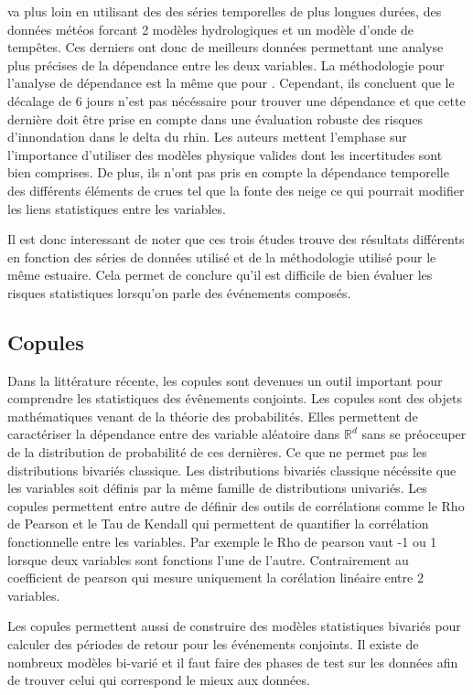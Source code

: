 \documentclass[12pt]{article}   %
\begin{document}
    \par
    \cite{Khanal2019} va plus loin en utilisant des des séries temporelles de plus longues durées, des données météos forcant 2 modèles hydrologiques et un modèle d'onde de tempêtes. Ces derniers ont donc de meilleurs données permettant une analyse plus précises de la dépendance entre les deux variables. La méthodologie pour l'analyse de dépendance est la même que pour \cite{Klerk2015}. Cependant, ils concluent que le décalage de 6 jours n'est pas nécéssaire pour trouver une dépendance et que cette dernière doit être prise en compte dans une évaluation robuste des risques d'innondation dans le delta du rhin. Les auteurs mettent l'emphase sur l'importance d'utiliser des modèles physique valides dont les incertitudes sont bien comprises. De plus, ils n'ont pas pris en compte la dépendance temporelle des différents éléments de crues tel que la fonte des neige ce qui pourrait modifier les liens statistiques entre les variables.  
\par
    Il est donc interessant de noter que ces trois études trouve des résultats différents en fonction des séries de données utilisé et de la méthodologie utilisé pour le même estuaire. Cela permet de conclure qu'il est difficile de bien évaluer les risques statistiques lorsqu'on parle des événements composés. 
\par
\subsection{Copules}
    Dans la littérature récente, les copules sont devenues un outil important pour comprendre les statistiques des évênements conjoints. Les copules sont des objets mathématiques venant de la théorie des probabilités. Elles permettent de caractériser la dépendance  entre des variable aléatoire dans $\displaystyle \mathbb{R} ^{d}$ sans se préoccuper de la distribution de probabilité de ces dernières. Ce que ne permet pas les distributions bivariés classique. Les distributions bivariés classique nécéssite que les variables soit définis par la même famille de distributions univariés.\cite{genest2007} Les copules permettent entre autre de définir des outils de corrélations comme le Rho de Pearson et le Tau de Kendall qui permettent de quantifier la corrélation fonctionnelle entre les variables. Par exemple le Rho de pearson vaut -1 ou 1 lorsque deux variables sont fonctions l'une de l'autre. Contrairement au coefficient de pearson qui mesure uniquement la corélation linéaire entre 2 variables. \par
    Les copules permettent aussi de construire des modèles statistiques bivariés pour calculer des périodes de retour pour les événements conjoints. Il existe de nombreux modèles bi-varié et il faut faire des phases de test sur les données afin de trouver celui qui correspond le mieux aux données. \cite{genest2007}
\end{document}
